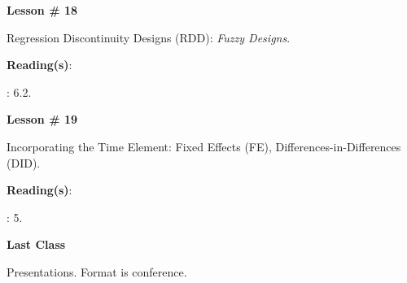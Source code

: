 \documentclass[letterpaper]{article}
\renewenvironment{itemize}{
  \begin{list}{}{
    \setlength{\leftmargin}{1.5em}
  }
}{
  \end{list}
}
\begin{document}
\begin{enumerate}
      \begin{itemize} 
        \item[$\bullet$] {\bf Lesson \# 18} %
          \begin{itemize} 
            \item[$\circ$] Regression Discontinuity Designs (RDD): \emph{Fuzzy Designs}.
            \item[$\circ$] {\bf Reading(s)}: 
              \begin{itemize}
                \item[$\diamond$] \textcite{Angrist2009}: 6.2.
              \end{itemize}
          \end{itemize}
      \end{itemize}


      \begin{itemize} 
        \item[$\bullet$] {\bf Lesson \# 19} %
          \begin{itemize} 
            \item[$\circ$] Incorporating the Time Element: Fixed Effects (FE), Differences-in-Differences (DID).
            \item[$\circ$] {\bf Reading(s)}: 
              \begin{itemize}
                \item[$\diamond$] \textcite{Angrist2009}: 5.
              \end{itemize}
          \end{itemize}
      \end{itemize}



      \begin{itemize} 
        \item[$\bullet$] {\bf Last Class}
          \begin{itemize} 
            \item[$\circ$] Presentations. Format is conference.
        \end{itemize}
      \end{itemize}


			

\end{enumerate}


\newpage
{}
\setcounter{page}{1}
\printbibliography
\end{document}
